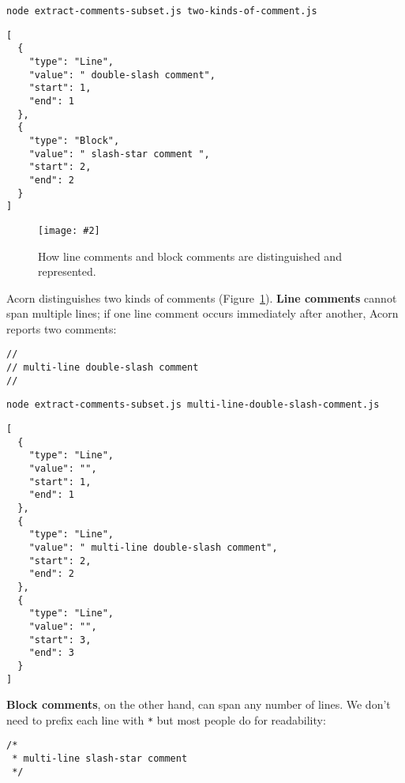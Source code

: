 \documentclass[krantzl]{krantz}
\newcommand{\figpdfhere}[4]{\begin{figure}[h]%
\centering%
\texttt{[image: \#2]}%
\caption{#3}%
\label{#1}%
\end{figure}}
\newcommand{\figref}[1]{Figure~\ref{#1}}
\newcommand{\glossref}[1]{\textbf{#1}}
\begin{document}
\begin{lstlisting}[frame=shadowbox]
node extract-comments-subset.js two-kinds-of-comment.js
\end{lstlisting}



\begin{lstlisting}[frame=tblr,backgroundcolor=\color{black!5}]
[
  {
    "type": "Line",
    "value": " double-slash comment",
    "start": 1,
    "end": 1
  },
  {
    "type": "Block",
    "value": " slash-star comment ",
    "start": 2,
    "end": 2
  }
]
\end{lstlisting}


\figpdfhere{doc-generator-comments}{./doc-generator/comments.pdf}{How line comments and block comments are distinguished and represented.}{0.6}


Acorn distinguishes two kinds of comments (\figref{doc-generator-comments}).
\glossref{Line comments} cannot span multiple lines;
if one line comment occurs immediately after another,
Acorn reports two comments:


\begin{lstlisting}[frame=tblr]
//
// multi-line double-slash comment
//
\end{lstlisting}



\begin{lstlisting}[frame=shadowbox]
node extract-comments-subset.js multi-line-double-slash-comment.js
\end{lstlisting}



\begin{lstlisting}[frame=tblr,backgroundcolor=\color{black!5}]
[
  {
    "type": "Line",
    "value": "",
    "start": 1,
    "end": 1
  },
  {
    "type": "Line",
    "value": " multi-line double-slash comment",
    "start": 2,
    "end": 2
  },
  {
    "type": "Line",
    "value": "",
    "start": 3,
    "end": 3
  }
]
\end{lstlisting}



\glossref{Block comments},
on the other hand,
can span any number of lines.
We don’t need to prefix each line with \texttt{*} but most people do for readability:


\begin{lstlisting}[frame=tblr]
/*
 * multi-line slash-star comment
 */
\end{lstlisting}
\end{document}
